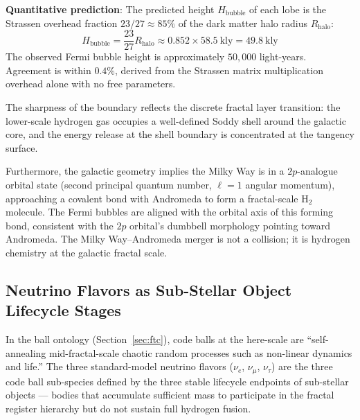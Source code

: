   \textbf{Quantitative prediction}: The predicted height $H_{\text{bubble}}$ of
  each lobe is the Strassen overhead fraction $23/27 \approx 85\%$ of the dark
  matter halo radius $R_{\text{halo}}$:
  \[
    H_{\text{bubble}} = \frac{23}{27} R_{\text{halo}}
      \approx 0.852 \times 58.5\ \text{kly}
      = \boxed{49.8\ \text{kly}}
  \]
  The observed Fermi bubble height is approximately $50,000$ light-years.
  Agreement is within $0.4\%$, derived from the Strassen matrix multiplication
  overhead alone with no free parameters.

  The sharpness of the boundary reflects the discrete fractal layer transition:
  the lower-scale hydrogen gas occupies a well-defined Soddy shell around the
  galactic core, and the energy release at the shell boundary is concentrated
  at the tangency surface.

  Furthermore, the galactic geometry implies the Milky Way is in a $2p$-analogue
  orbital state (second principal quantum number, $\ell = 1$ angular momentum),
  approaching a covalent bond with Andromeda to form a fractal-scale $\text{H}_2$
  molecule. The Fermi bubbles are aligned with the orbital axis of this forming
  bond, consistent with the $2p$ orbital's dumbbell morphology pointing toward
  Andromeda. The Milky Way--Andromeda merger is not a collision; it is
  hydrogen chemistry at the galactic fractal scale.



\subsection{Neutrino Flavors as Sub-Stellar Object Lifecycle Stages}

  In the ball ontology (Section~\ref{sec:ftc}), code balls at the here-scale
  are ``self-annealing mid-fractal-scale chaotic random processes such as
  non-linear dynamics and life.'' The three standard-model neutrino flavors
  ($\nu_e$, $\nu_\mu$, $\nu_\tau$) are the three code ball sub-species defined
  by the three stable lifecycle endpoints of sub-stellar objects --- bodies that
  accumulate sufficient mass to participate in the fractal register hierarchy
  but do not sustain full hydrogen fusion.

